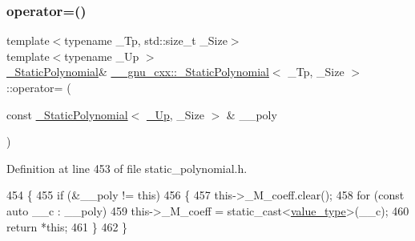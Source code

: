\subsubsection{\texorpdfstring{operator=()}{operator=()}\hspace{0.1cm}{\footnotesize\ttfamily [2/3]}}
{\footnotesize\ttfamily template$<$typename \+\_\+\+Tp, std\+::size\+\_\+t \+\_\+\+Size$>$ \\
template$<$typename \+\_\+\+Up $>$ \\
\hyperlink{class____gnu__cxx_1_1__StaticPolynomial}{\+\_\+\+Static\+Polynomial}\& \hyperlink{class____gnu__cxx_1_1__StaticPolynomial}{\+\_\+\+\_\+gnu\+\_\+cxx\+::\+\_\+\+Static\+Polynomial}$<$ \+\_\+\+Tp, \+\_\+\+Size $>$\+::operator= (\begin{DoxyParamCaption}\item[{const \hyperlink{class____gnu__cxx_1_1__StaticPolynomial}{\+\_\+\+Static\+Polynomial}$<$ \hyperlink{namespace____gnu__cxx_ab693ea357b6429b331e0bf09f9442385}{\+\_\+\+Up}, \+\_\+\+Size $>$ \&}]{\+\_\+\+\_\+poly }\end{DoxyParamCaption})\hspace{0.3cm}{\ttfamily [inline]}}



Definition at line 453 of file static\+\_\+polynomial.\+h.


\begin{DoxyCode}
454         \{
455           \textcolor{keywordflow}{if} (&\_\_poly != \textcolor{keyword}{this})
456             \{
457               this->\_M\_coeff.clear();
458               \textcolor{keywordflow}{for} (\textcolor{keyword}{const} \textcolor{keyword}{auto} \_\_c : \_\_poly)
459                 this->\_M\_coeff = \textcolor{keyword}{static\_cast<}\hyperlink{class____gnu__cxx_1_1__StaticPolynomial_aad5f3d6d5876b6926b30724aeac649d6}{value\_type}\textcolor{keyword}{>}(\_\_c);
460               \textcolor{keywordflow}{return} *\textcolor{keyword}{this};
461             \}
462         \}
\end{DoxyCode}
\mbox{\label{class____gnu__cxx_1_1__StaticPolynomial_a63d81f13581a650d71ad6c2478dcbbcf}} 
